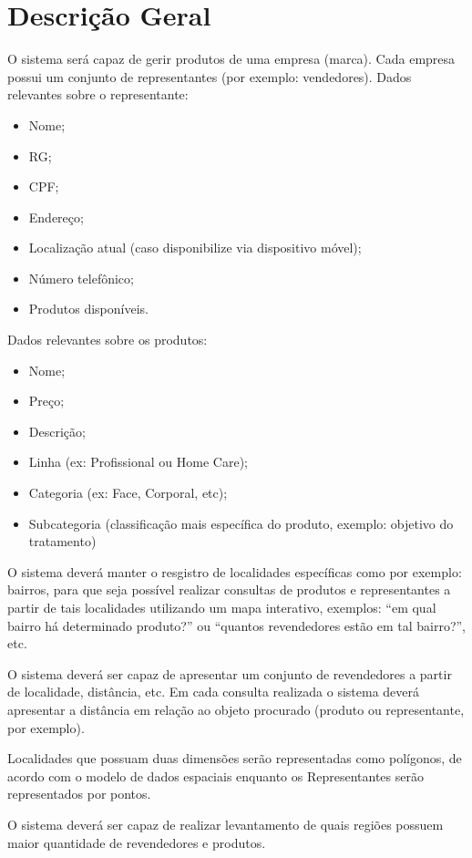 \documentclass[oneside]{article}
\begin{document}
\section{Descrição Geral}
O sistema será capaz de gerir produtos de uma empresa (marca). Cada empresa
possui um conjunto de representantes (por exemplo: vendedores).
Dados relevantes sobre o representante:
\begin{itemize}
    \item Nome;
    \item RG;
    \item CPF;
    \item Endereço;
    \item Localização atual (caso disponibilize via dispositivo móvel);
    \item Número telefônico;
    \item Produtos disponíveis.
\end{itemize}
Dados relevantes sobre os produtos:
\begin{itemize}
    \item Nome;
    \item Preço;
    \item Descrição;
    \item Linha (ex: Profissional ou Home Care);
    \item Categoria (ex: Face, Corporal, etc);
    \item Subcategoria (classificação mais específica do produto, exemplo: objetivo do tratamento)
\end{itemize}

O sistema deverá manter o resgistro de localidades específicas como por exemplo:
bairros, para que seja possível realizar consultas de produtos e representantes
a partir de tais localidades utilizando um mapa interativo, exemplos:
``em qual bairro há determinado produto?'' ou ``quantos revendedores estão em tal bairro?'',
etc.

O sistema deverá ser capaz de apresentar um conjunto de revendedores a
partir de localidade, distância, etc. Em cada consulta realizada o sistema
deverá apresentar a distância em relação ao objeto procurado (produto ou
representante, por exemplo).

Localidades que possuam duas dimensões serão
representadas como polígonos, de acordo com o modelo de dados espaciais enquanto
os Representantes serão representados por pontos.

O sistema deverá ser capaz de realizar levantamento de quais regiões possuem maior
quantidade de revendedores e produtos.
\end{document}

